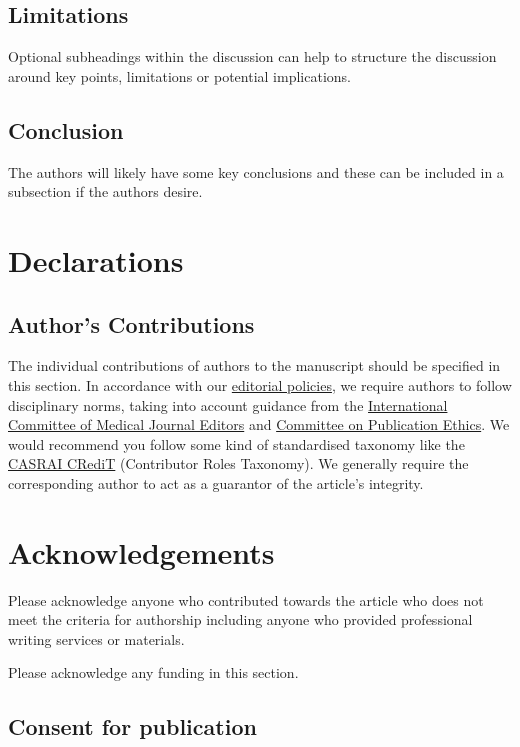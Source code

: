 \documentclass[a4paper,num-refs]{ehi-journals}
\begin{document}
\subsection{Limitations}

Optional subheadings within the discussion can help to structure the discussion around key points, limitations or potential implications.

\subsection{Conclusion}

The authors will likely have some key conclusions and these can be included in a subsection if the authors desire.

\section{Declarations}

\subsection{Author's Contributions}

The individual contributions of authors to the manuscript should be specified in this section. In accordance with our \href{https://about.epistemehealth.com/policy/}{editorial policies}, we require authors to follow disciplinary norms, taking into account guidance from the \href{http://www.icmje.org/}{International Committee of Medical Journal Editors} and \href{https://publicationethics.org/resources/discussion-documents/what-constitutes-authorship-english-june-2014}{Committee on Publication Ethics}. We would recommend you follow some kind of standardised taxonomy like the \href{http://docs.casrai.org/CRediT}{CASRAI CRediT} (Contributor Roles Taxonomy). We generally require the corresponding author to act as a guarantor of the article's integrity.

\section{Acknowledgements}

Please acknowledge anyone who contributed towards the article who does not meet the criteria for authorship including anyone who provided professional writing services or materials.

Please acknowledge any funding in this section.

\subsection{Consent for publication}
\end{document}
